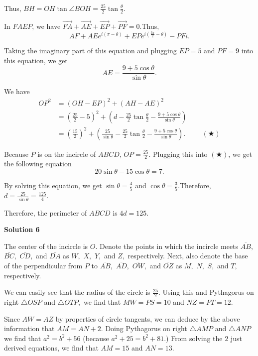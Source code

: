\begin{enumerate}
{{ Thus, $BH = OH \tan \angle BOH = \frac{25}{2} \tan \frac{\theta}{2}$.

 In $FAEP$, we have $\overrightarrow{FA} + \overrightarrow{AE} + \overrightarrow{EP} + \overrightarrow{PF} = 0$.Thus,
 \[ AF + AE e^{i \left( \pi - \theta \right)} + EP e^{i \left( \frac{3 \pi}{2} - \theta \right)} - PF i . \]

 Taking the imaginary part of this equation and plugging $EP = 5$ and $PF = 9$ into this equation, we get
 \[ AE = \frac{9 + 5 \cos \theta}{\sin \theta} . \]

 We have
 \begin{align*} OP^2 & = \left( OH - EP \right)^2 + \left( AH - AE \right)^2 \\ & = \left( \frac{25}{2} - 5 \right)^2 + \left( d - \frac{25}{2} \tan \frac{\theta}{2} - \frac{9 + 5 \cos \theta}{\sin \theta} \right) \\ & = \left( \frac{15}{2} \right)^2 + \left( \frac{25}{\sin \theta} - \frac{25}{2} \tan \frac{\theta}{2} - \frac{9 + 5 \cos \theta}{\sin \theta} \right) . \hspace{1cm} (\bigstar) \end{align*}


 Because $P$ is on the incircle of $ABCD$, $OP = \frac{25}{2}$. Plugging this into $(\bigstar)$, we get the following equation
 \[ 20 \sin \theta - 15 \cos \theta = 7 . \]

 By solving this equation, we get $\sin \theta = \frac{4}{5}$ and $\cos \theta = \frac{3}{5}$.Therefore, $d = \frac{25}{\sin \theta} = \frac{125}{4}$.

 Therefore, the perimeter of $ABCD$ is $4d = \boxed{125}$.

 



\textbf{Solution 6}

The center of the incircle is $O.$ Denote the points in which the incircle meets $\overline{AB},$ $\overline{BC},$ $\overline{CD},$ and $\overline{DA}$ as $W,$ $X,$ $Y,$ and $Z,$ respectively. Next, also denote the base of the perpendicular from $P$ to $\overline{AB},$ $\overline{AD},$ $\overline{OW},$ and $\overline{OZ}$ as $M,$ $N,$ $S,$ and $T,$ respectively.

 We can easily see that the radius of the circle is $\frac{25}{2}.$ Using this and Pythagorus on right $\triangle OSP$ and $\triangle OTP,$ we find that $MW = PS = 10$ and $NZ = PT = 12.$

 Since $AW = AZ$ by properties of circle tangents, we can deduce by the above information that $AM = AN+2.$ Doing Pythagorus on right $\triangle AMP$ and $\triangle ANP$ we find that $a^2 = b^2 + 56$ (because $a^2+25=b^2+81.$) From solving the $2$ just derived equations, we find that $AM=15$ and $AN=13.$

}}
\end{enumerate}
